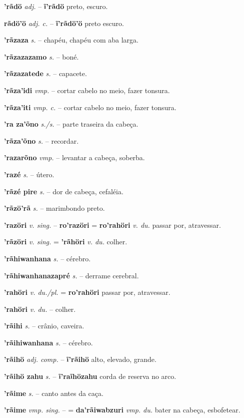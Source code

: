 \textbf{'rãdö} \textit{adj.} -- \textbf{ĩ'rãdö} preto, escuro.

\textbf{rãdö'ö} \textit{adj. c.} -- \textbf{ĩ'rãdö'ö} preto escuro.

\textbf{'rãzaza} \textit{s.} -- chapéu, chapéu com aba larga.

\textbf{'rãzazazamo} \textit{s.} -- boné.

\textbf{'rãzazatede} \textit{s.} -- capacete.

\textbf{'rãza'idi} \textit{vmp.} -- cortar cabelo no meio, fazer tonsura.

\textbf{'rãza'iti} \textit{vmp. c.} -- cortar cabelo no meio, fazer tonsura.

\textbf{'ra za'õno} \textit{s./s.} -- parte traseira da cabeça.

\textbf{'rãza'õno} \textit{s.} -- recordar.

\textbf{'razarõno} \textit{vmp.} -- levantar a cabeça, soberba.

\textbf{'razé} \textit{s.} -- útero.

\textbf{'rãzé pire} \textit{s.} -- dor de cabeça, cefaléia.

\textbf{'rãzö'rã} \textit{s.} -- marimbondo preto.

\textbf{'razöri} \textit{v. sing.} -- \textbf{ro'razöri} = \textbf{ro'rahöri} \textit{v. du.} passar por, atravessar.

\textbf{'rãzöri} \textit{v. sing.} = \textbf{'rãhöri} \textit{v. du.} colher.

\textbf{'rãhiwanhana} \textit{s.} -- cérebro.

\textbf{'rãhiwanhanazapré} \textit{s.} -- derrame cerebral.

\textbf{'rahöri} \textit{v. du./pl.} = \textbf{ro'rahöri} passar por, atravessar.

\textbf{'rahöri} \textit{v. du.} -- colher.

\textbf{'rãihi} \textit{s.} -- crânio, caveira.

\textbf{'rãihiwanhana} \textit{s.} -- cérebro.

\textbf{'rãihö} \textit{adj. comp.} -- \textbf{ĩ'rãihö} alto, elevado, grande.

\textbf{'rãihö zahu} \textit{s.} -- \textbf{ĩ'raĩhözahu} corda de reserva no arco.

\textbf{'rãime} \textit{s.} -- canto antes da caça.

\textbf{'rãime} \textit{vmp. sing.} -- = \textbf{da'rãiwabzuri} \textit{vmp. du.} bater na cabeça, esbofetear.

